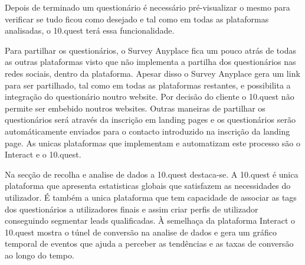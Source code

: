 Depois de terminado um questionário é necessário pré-visualizar o mesmo para verificar se tudo ficou como desejado e tal como em todas as plataformas analisadas, o 10.quest terá essa funcionalidade. 

Para partilhar os questionários, o Survey Anyplace fica um pouco atrás de todas as outras plataformas visto que não implementa a partilha dos questionários nas redes sociais, dentro da plataforma. Apesar disso o Survey Anyplace gera um link para ser partilhado, tal como em todas as plataformas restantes, e possibilita a integração do questionário noutro website. Por decisão do cliente o 10.quest não permite ser embebido noutros websites.  Outras maneiras de partilhar os questionários será através da inscrição em landing pages e os questionários serão automáticamente enviados para o contacto introduzido na inscrição da landing page. As unicas plataformas que implementam e automatizam este processo são o Interact e o 10.quest. 

Na secção de recolha e analise de dados a 10.quest destaca-se. A 10.quest é unica plataforma que apresenta estatisticas globais que satisfazem as necessidades do utilizador. É também a unica plataforma que tem capacidade de associar as tags dos questionários a utilizadores finais e assim criar perfis de utilizador conseguindo segmentar leads qualificadas. À semelhaça da plataforma Interact o 10.quest mostra o túnel de conversão na analise de dados e gera um gráfico temporal de eventos que ajuda a perceber as tendências e as taxas de conversão ao longo do tempo.
 


	
	
